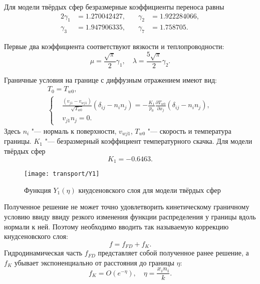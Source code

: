 \documentclass[english,russian,a4paper,12pt]{article}
\newcommand{\pder}[2][]{\frac{\partial#1}{\partial#2}}
\begin{document}
Для модели твёрдых сфер безразмерные коэффициенты переноса равны
\begin{alignat*}{2}
	\gamma_1 &= 1.270042427, &\quad \gamma_2 &= 1.922284066, \\
	\gamma_3 &= 1.947906335, &\quad \gamma_7 &= 1.758705.
\end{alignat*}

Первые два коэффициента соответствуют вязкости и теплопроводности:
\[ \mu = \frac{\sqrt\pi}2\gamma_1, \quad \lambda = \frac{5\sqrt\pi}2\gamma_2. \]

Граничные условия на границе с диффузным отражением имеют вид:
\begin{gather}
	T_0 = T_{w0}, \label{eq:bound:T} \\
	\left\{
	\begin{aligned}
		& \frac{(v_{j1}-v_{wj1})}{\sqrt{T_{w0}}}(\delta_{ij}-n_in_j) = 
			-\frac{K_1}{p_0}\pder[T_{w0}]{x_j}(\delta_{ij}-n_in_j), \\
		& v_{j1}n_j = 0.
	\end{aligned}
	\right. \label{eq:bound:v}
\end{gather}
Здесь \(n_i\) "--- нормаль к поверхности, \(v_{wj1}\), \(T_{w0}\) "--- скорость и температура границы.
\(K_1\) "--- безразмерный коэффициент температурного скачка. Для модели твёрдых сфер 
\[ K_1 = -0.6463. \]

\begin{wrapfigure}{r}{7cm}
	\vspace{-10pt}
	\centering
	\texttt{[image: transport/Y1]}
	\vspace{-15pt}
	\caption{Функция \(Y_1(\eta)\) кнудсеновского слоя для модели твёрдых сфер}\label{fig:Y1}
	\vspace{-5pt}
\end{wrapfigure}

Полученное решение не может точно удовлетворить кинетическому граничному условию ввиду
ввиду резкого изменения функции распределения у границы вдоль нормали к ней.
Поэтому необходимо вводить так называемую коррекцию кнудсеновского слоя:
\begin{equation}
	f = f_{FD} + f_K.
\end{equation}
Гидродинамическая часть \(f_{FD}\) представляет собой полученное ранее решение,
а \(f_K\) убывает экспоненциально от расстояния до границы \(\eta\):
\begin{equation}
	f_K = O\left(e^{-\eta}\right), \quad \eta = \frac{x_in_i}k.
\end{equation}
\end{document}
